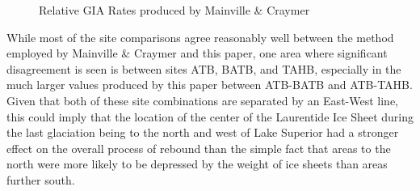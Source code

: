 \begin{figure}[h]
	\caption{Relative GIA Rates produced by Mainville \& Craymer}
	\label{fig:craymerGIARates}
\end{figure}
\newpage

While most of the site comparisons agree reasonably well between the method
employed by Mainville \& Craymer and this paper, one area where significant
disagreement is seen is between sites ATB, BATB, and TAHB, especially in the much
larger values produced by this paper between ATB-BATB and ATB-TAHB. Given that both
of these site combinations are separated by an East-West line, this could imply
that the location of the center of the Laurentide Ice Sheet during the last glaciation being to the
north and west of Lake Superior had a stronger effect on the overall process of
rebound than the simple fact that areas to the north were more likely to be
depressed by the weight of ice sheets than areas further south.
